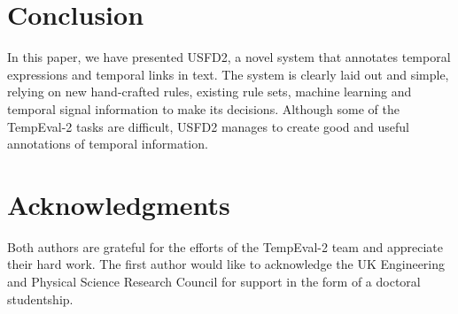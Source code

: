 \documentclass[11pt]{article}
\begin{document}
\section{Conclusion}
\label{conclusion}

In this paper, we have presented USFD2, a novel system that annotates temporal expressions and temporal links in text. The system is clearly laid out and simple, relying on new hand-crafted rules, existing rule sets, machine learning and temporal signal information to make its decisions. Although some of the TempEval-2 tasks are difficult, USFD2 manages to create good and useful annotations of temporal information.

\section*{Acknowledgments}
Both authors are grateful for the efforts of the TempEval-2 team and appreciate their hard work. The first author would like to acknowledge the UK Engineering and Physical Science Research Council for support in the form of a doctoral studentship.



\end{document}
